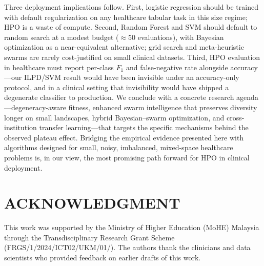\documentclass[letterpaper, 10 pt, conference]{ieeeconf}
\begin{document}
Three deployment implications follow. First, logistic regression should be trained with default regularization on any healthcare tabular task in this size regime; HPO is a waste of compute. Second, Random Forest and SVM should default to random search at a modest budget ($\approx 50$ evaluations), with Bayesian optimization as a near-equivalent alternative; grid search and meta-heuristic swarms are rarely cost-justified on small clinical datasets. Third, HPO evaluation in healthcare must report per-class $F_1$ and false-negative rate alongside accuracy---our ILPD/SVM result would have been invisible under an accuracy-only protocol, and in a clinical setting that invisibility would have shipped a degenerate classifier to production. We conclude with a concrete research agenda---degeneracy-aware fitness, enhanced swarm intelligence that preserves diversity longer on small landscapes, hybrid Bayesian--swarm optimization, and cross-institution transfer learning---that targets the specific mechanisms behind the observed plateau effect. Bridging the empirical evidence presented here with algorithms designed for small, noisy, imbalanced, mixed-space healthcare problems is, in our view, the most promising path forward for HPO in clinical deployment.

\section*{ACKNOWLEDGMENT}

This work was supported by the Ministry of Higher Education (MoHE) Malaysia through the Transdisciplinary Research Grant Scheme (FRGS/1/2024/ICT02/UKM/01/). The authors thank the clinicians and data scientists who provided feedback on earlier drafts of this work.

\end{document}
